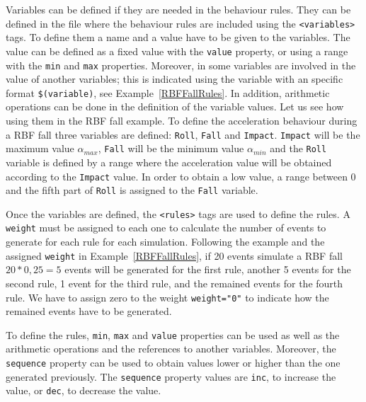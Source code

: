 \documentclass[journal]{IEEEtran}
\begin{document}
Variables can be defined if they are needed in the behaviour rules. They can be defined in the file where
the behaviour rules are included using the \texttt{\small{<variables>}} tags. To define them a name and a value 
have to be given to the variables. The value can be defined as a fixed value with the \texttt{\small{value}} 
property, or using a range with the \texttt{\small{min}} and \texttt{\small{max}} properties. Moreover, in some variables
are involved in the value of another variables; this is indicated using the variable with an specific 
format \texttt{\small{\$(variable)}}, see Example~\ref{RBFFallRules}. In addition, arithmetic operations can be 
done in the definition of the variable values. Let us see how using them in the RBF fall example. To 
define the acceleration behaviour during a RBF fall three variables are defined: \texttt{\small{Roll}}, 
\texttt{\small{Fall}} and \texttt{\small{Impact}}. \texttt{\small{Impact}} will be the maximum value $\alpha_{max}$, 
\texttt{\small{Fall}} will be the minimum value $\alpha_{min}$ and the \texttt{\small{Roll}} variable is defined by a 
range where the acceleration value will be obtained according to the \texttt{\small{Impact}} value. In order to
obtain a low value, a range between 0 and the fifth part of \texttt{\small{Roll}} is assigned to the \texttt{\small{Fall}} 
variable.

Once the variables are defined, the \texttt{\small{<rules>}} tags are used to define the rules. A \texttt{\small{weight}}
must be assigned to each one to calculate the number of events to generate for each rule for each simulation.
Following the example and the assigned \texttt{\small{weight}} in Example~\ref{RBFFallRules}, if 20 events simulate 
a RBF fall $20 * 0,25 = 5$ events will be generated for the first rule, another 5 events for the second rule,
1 event for the third rule, and the remained events for the fourth rule. We have to assign zero to the weight
\texttt{\small{weight="0"}} to indicate how the remained events have to be generated.

To define the rules, \texttt{\small{min}}, \texttt{\small{max}} and \texttt{\small{value}} properties can be used as well as the arithmetic 
operations and the references to another variables. Moreover, the \texttt{\small{sequence}} property can be used to obtain
values lower or higher than the one generated previously. The \texttt{\small{sequence}} property values are \texttt{\small{inc}}, 
to increase the value, or \texttt{\small{dec}}, to decrease the value.
\end{document}
